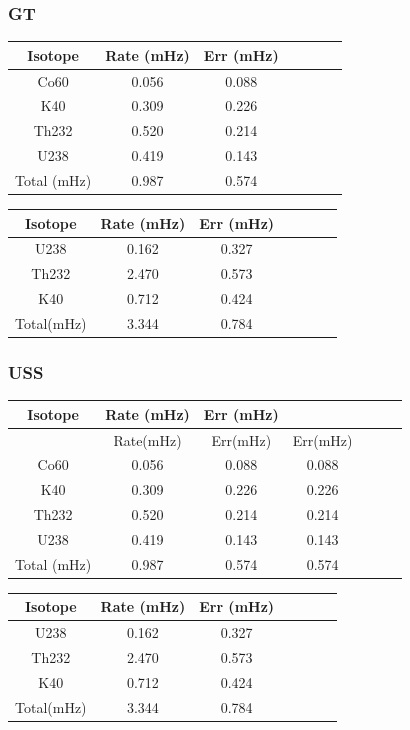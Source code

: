 \documentclass[review,number,sort&compress]{elsarticle}
\begin{document}
\subsubsection{GT}
\begin{tabular*}{150mm}{@{\extracolsep{\fill}}ccccccc}
	\toprule  %
	Isotope	& Rate (mHz)&	Err (mHz)\\
	\midrule  %
	Co60	& 	0.056&	0.088	\\ 
	K40	& 	0.309&	0.226	\\
	Th232&	0.520&	0.214	\\
	U238 &    0.419&	0.143	\\
	Total (mHz)&	0.987&	0.574	\\
	\bottomrule  %
\end{tabular*}

\begin{tabular*}{150mm}{@{\extracolsep{\fill}}ccccccc}
	\toprule  %
	Isotope	&	Rate (mHz)&	Err (mHz)\\
	\midrule  %
	U238	&	0.162	  &      0.327\\ 
	Th232	&	2.470	  &      0.573\\
	K40	&	0.712	  &      0.424\\
	Total(mHz)&	3.344	  &      0.784\\
	\bottomrule  %
\end{tabular*}

\subsubsection{USS}
\begin{tabular*}{150mm}{@{\extracolsep{\fill}}ccccccc}
	Isotope	& Rate (mHz)&	Err (mHz)\\
	\toprule  %
			&   Rate(mHz)&	Err(mHz)&Err(mHz)\\
	\midrule  %
	Co60		& 	0.056&	0.088	&0.088	\\ 
	K40		& 	0.309&	0.226	&0.226	\\
	Th232		&	0.520&	0.214	&0.214	\\
	U238 		&    	0.419&	0.143	&0.143	\\
	Total (mHz)	&	0.987&	0.574	&0.574	\\
	\bottomrule  %
\end{tabular*}

\begin{tabular*}{150mm}{@{\extracolsep{\fill}}ccccccc}
	\toprule  %
	Isotope	&	Rate (mHz)&	Err (mHz)\\
	\midrule  %
	U238	&	0.162	  &      0.327\\ 
	Th232	&	2.470	  &      0.573\\
	K40	&	0.712	  &      0.424\\
	Total(mHz)&	3.344	  &      0.784\\
	\bottomrule  %
\end{tabular*}
\end{document}
